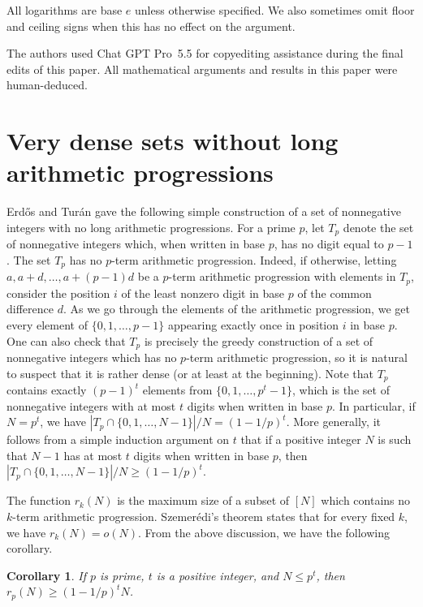 \documentclass[11pt]{article}
\numberwithin{equation}{section}
\newtheorem{cor}[result]{Corollary}
\theoremstyle{definition}
\theoremstyle{remark}
\begin{document}
All logarithms are base $e$ unless otherwise specified. We also sometimes omit floor and ceiling signs when this has no effect on the argument. 

 The authors used Chat GPT Pro~5.5 for copyediting assistance during the final edits of this paper. All mathematical arguments and results in this paper were human-deduced.

\section{Very dense sets without long arithmetic progressions}\label{sec:dense}

Erd\H{o}s and Tur\'an \cite{ErTu} gave the following simple construction of a set of nonnegative integers with no long arithmetic progressions. For a prime $p$, let $T_p$ denote the set of nonnegative integers which, when written in base $p$, has no digit equal to $p-1$. The set $T_p$ has no $p$-term arithmetic progression. Indeed, if otherwise, letting $a,a+d,\ldots,a+(p-1)d$ be a $p$-term arithmetic progression with elements in $T_p$, consider the position $i$ of the least nonzero digit in base $p$ of the common difference $d$. As we go through the elements of the arithmetic progression, we get every element of $\{0,1,\ldots,p-1\}$ appearing exactly once in position $i$ in base $p$. One can also check that $T_p$ is precisely the greedy construction of a set of nonnegative integers which has no $p$-term arithmetic progression, so it is natural to suspect that it is rather dense (or at least at the beginning). Note that $T_p$ contains exactly $(p-1)^t$ elements from $\{0,1,\ldots,p^t-1\}$, which is the set of nonnegative integers with at most $t$ digits when written in base $p$. In particular, if $N=p^t$, we have $|T_p \cap \{0,1,\ldots,N-1\}|/N= (1-1/p)^t$. More generally, it follows from a simple induction argument on $t$ that if a positive integer $N$ is such that $N-1$ has at most $t$ digits when written in base $p$, then $|T_p \cap \{0,1,\ldots,N-1\}|/N \geq (1-1/p)^t$. 

The function $r_k(N)$ is the maximum size of a subset of $[N]$ which contains no $k$-term arithmetic progression. Szemer\'edi's theorem \cite{Szemeredi} states that for every fixed $k$, we have $r_k(N)=o(N)$. From the above discussion, we have the following corollary. 

\begin{cor}\label{szemcor}
If $p$ is prime, $t$ is a positive integer, and $N \leq p^t$, then $r_p(N) \geq (1-1/p)^t N$. 
\end{cor}
\end{document}
